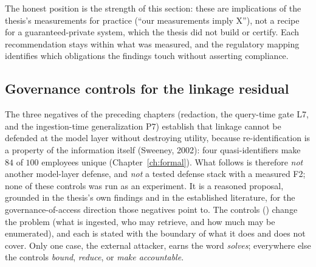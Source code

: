 The honest position is the strength of this section: these are implications of the thesis's measurements
for practice (``our measurements imply X''), not a recipe for a guaranteed-private system, which the
thesis did not build or certify. Each recommendation stays within what was measured, and the regulatory
mapping identifies which obligations the findings touch without asserting compliance.

\subsection{Governance controls for the linkage residual}
\label{sec:disc-governance}

The three negatives of the preceding chapters (redaction, the query-time gate L7, and the
ingestion-time generalization P7) establish that linkage cannot be defended at the model layer
without destroying utility, because re-identification is a property of the information itself
(Sweeney, 2002): four quasi-identifiers make $84$ of $100$ employees unique
(Chapter~\ref{ch:formal}). What follows is therefore \emph{not} another model-layer defense, and
\emph{not} a tested defense stack with a measured F2; none of these controls was run as an experiment.
It is a reasoned proposal, grounded in the thesis's own findings and in the established literature, for the
governance-of-access direction those negatives point to. The controls () change the problem (what is
ingested, who may retrieve, and how much may be enumerated), and each is stated with the boundary of what
it does and does not cover. Only one case, the external attacker, earns the word \emph{solves}; everywhere
else the controls \emph{bound}, \emph{reduce}, or \emph{make accountable}.

